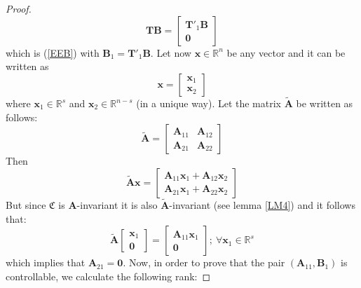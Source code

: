 \documentclass[a4paper,10pt,oneside]{book}
\begin{document}
\begin{proof}
\begin{equation}
 \mathbf{TB}=\left[ {\begin{array}{c}
      \mathbf{T}'_{1}\mathbf{B} \\ \mathbf{0}
\end{array} } \right]
\end{equation}
which is (\ref{EEB}) with $\mathbf{B}_1=\mathbf{T}'_1\mathbf{B}$. Let now $\mathbf{x}\in\mathbb{R}^n$ be any vector and it can be written as
\begin{equation}
 \mathbf{x}=\left[ {\begin{array}{c}
      \mathbf{x}_{1} \\ \mathbf{x}_2
\end{array} } \right]
\end{equation}
where $\mathbf{x}_1\in\mathbb{R}^s$ and $\mathbf{x}_2\in\mathbb{R}^{n-s}$ (in a unique way). Let the matrix $\tilde{\mathbf{A}}$ be written as follows:
\begin{equation}
 \tilde{\mathbf{A}}=\left[ {\begin{array}{cc}
      \mathbf{A}_{11} & \mathbf{A}_{12} \\ 
      \mathbf{A}_{21} & \mathbf{A}_{22}
\end{array} } \right]
\end{equation}
Then
\begin{equation}
 \tilde{\mathbf{A}}\mathbf{x}=\left[ {\begin{array}{c}
      \mathbf{A}_{11}\mathbf{x}_1 + \mathbf{A}_{12}\mathbf{x}_2 \\ 
      \mathbf{A}_{21}\mathbf{x}_1+ \mathbf{A}_{22}\mathbf{x}_2
\end{array} } \right]
\end{equation}
But since $\mathfrak{C}$ is $\mathbf{A}$-invariant it is also $\tilde{\mathbf{A}}$-invariant (see lemma \ref{LM4}) and it follows that:
\begin{equation}
 \tilde{\mathbf{A}}\left[ {\begin{array}{c}
      \mathbf{x}_{1} \\ \mathbf{0}
\end{array} } \right]=\left[ {\begin{array}{c}
      \mathbf{A}_{11}\mathbf{x}_1 \\ 
      \mathbf{0}
\end{array} } \right];\ \forall \mathbf{x}_1\in\mathbb{R}^s
\end{equation}
which implies that $\mathbf{A}_{21}=\mathbf{0}$. Now, in order to prove that the pair $(\mathbf{A}_{11},\mathbf{B}_{1})$ is controllable, we calculate the following rank:

\end{proof}
\end{document}
